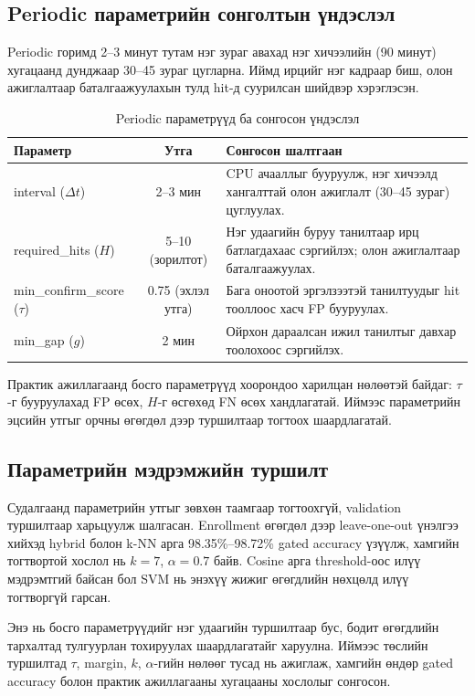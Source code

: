\subsection{Periodic параметрийн сонголтын үндэслэл}
Periodic горимд 2--3 минут тутам нэг зураг авахад нэг хичээлийн (90 минут) хугацаанд дунджаар 30--45 зураг цугларна. Иймд ирцийг нэг кадраар биш, олон ажиглалтаар баталгаажуулахын тулд hit-д суурилсан шийдвэр хэрэглэсэн.

\begin{table}[H]
  \centering
  \caption{Periodic параметрүүд ба сонгосон үндэслэл}
  \label{tab:periodic-params-rationale}
  \begin{tabular}{|l|c|p{8.5cm}|}
    \hline
    \textbf{Параметр} & \textbf{Утга} & \textbf{Сонгосон шалтгаан} \\
    \hline
    interval (\(\Delta t\)) & 2--3 мин & CPU ачааллыг бууруулж, нэг хичээлд хангалттай олон ажиглалт (30--45 зураг) цуглуулах. \\
    \hline
    required\_hits (\(H\)) & 5--10 (зорилтот) & Нэг удаагийн буруу танилтаар ирц батлагдахаас сэргийлэх; олон ажиглалтаар баталгаажуулах. \\
    \hline
    min\_confirm\_score (\(\tau\)) & 0.75 (эхлэл утга) & Бага оноотой эргэлзээтэй танилтуудыг hit тооллоос хасч FP бууруулах. \\
    \hline
    min\_gap (\(g\)) & 2 мин & Ойрхон дараалсан ижил танилтыг давхар тоолохоос сэргийлэх. \\
    \hline
  \end{tabular}
\end{table}

Практик ажиллагаанд босго параметрүүд хоорондоо харилцан нөлөөтэй байдаг: \(\tau\)-г бууруулахад FP өсөх, \(H\)-г өсгөхөд FN өсөх хандлагатай. Иймээс параметрийн эцсийн утгыг орчны өгөгдөл дээр туршилтаар тогтоох шаардлагатай.

\subsection{Параметрийн мэдрэмжийн туршилт}
Судалгаанд параметрийн утгыг зөвхөн таамгаар тогтоохгүй, validation туршилтаар харьцуулж шалгасан. Enrollment өгөгдөл дээр leave-one-out үнэлгээ хийхэд hybrid болон k-NN арга 98.35\%--98.72\% gated accuracy үзүүлж, хамгийн тогтвортой хослол нь \(k=7\), \(\alpha=0.7\) байв. Cosine арга threshold-оос илүү мэдрэмтгий байсан бол SVM нь энэхүү жижиг өгөгдлийн нөхцөлд илүү тогтворгүй гарсан.

Энэ нь босго параметрүүдийг нэг удаагийн туршилтаар бус, бодит өгөгдлийн тархалтад тулгуурлан тохируулах шаардлагатайг харуулна. Иймээс төслийн туршилтад \(\tau\), margin, \(k\), \(\alpha\)-гийн нөлөөг тусад нь ажиглаж, хамгийн өндөр gated accuracy болон практик ажиллагааны хугацааны хослолыг сонгосон.

